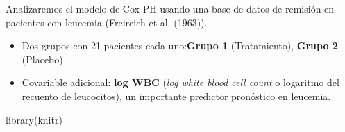 \documentclass[
]{article}
\newenvironment{Shaded}{\begin{snugshade}}{\end{snugshade}}
\newcommand{\FunctionTok}[1]{\textcolor[rgb]{0.28,0.35,0.67}{#1}}
\newcommand{\NormalTok}[1]{\textcolor[rgb]{0.00,0.23,0.31}{#1}}
\providecommand{\tightlist}{%
  \setlength{\itemsep}{0pt}\setlength{\parskip}{0pt}}\usepackage{longtable,booktabs,array}
\begin{document}
Analizaremos el modelo de Cox PH usando una base de datos de remisión en
pacientes con leucemia (Freireich et al. (1963)).

\begin{itemize}
\tightlist
\item
  Dos grupos con 21 pacientes cada uno:\textbf{Grupo 1} (Tratamiento),
  \textbf{Grupo 2} (Placebo)
\item
  Covariable adicional: \textbf{log WBC} (\emph{log white blood cell
  count} o logaritmo del recuento de leucocitos), un importante
  predictor pronóstico en leucemia.
\end{itemize}

\begin{tcolorbox}[enhanced jigsaw, opacityback=0, bottomrule=.15mm, leftrule=.75mm, rightrule=.15mm, arc=.35mm, toprule=.15mm, left=2mm, colframe=quarto-callout-note-color-frame, breakable, colback=white]

\begin{Shaded}
\begin{Highlighting}[]
\FunctionTok{library}\NormalTok{(knitr)}



\end{Highlighting}
\end{Shaded}
\end{tcolorbox}
\end{document}
